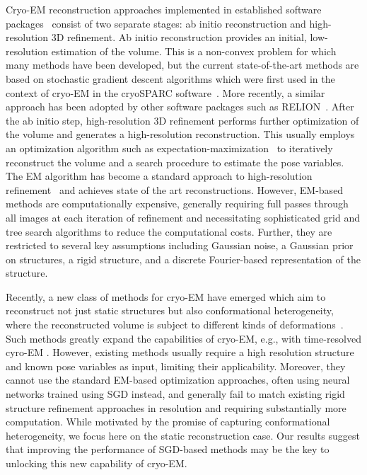 \documentclass{article}
\begin{document}
Cryo-EM reconstruction approaches implemented in established software packages~\cite{scheres_relion_2012,punjani_cryosparc_2017} consist of two separate stages: ab initio reconstruction and high-resolution 3D refinement. 
Ab initio reconstruction provides an initial, low-resolution estimation of the volume. 
This is a non-convex problem for which many methods have been developed, but the current state-of-the-art methods are based on stochastic gradient descent algorithms which were first used in the context of cryo-EM in the cryoSPARC software~\cite{punjani_building_2017,punjani_cryosparc_2017}. 
More recently, a similar approach has been adopted by other software packages such as RELION~\cite{kimanius_new_2021}.
After the ab initio step, high-resolution 3D refinement performs further optimization of the volume and generates a high-resolution reconstruction.
This usually employs an optimization algorithm such as 
expectation-maximization~\cite{dempster_maximum_1977} to iteratively reconstruct 
the volume and a search procedure to estimate the pose variables.
The EM algorithm has become a standard approach to high-resolution refinement~\cite{tagare_fast_2008,scheres_bayesian_2012,scheres_relion_2012,punjani_cryosparc_2017} and achieves state of the art reconstructions.
However, EM-based methods are computationally expensive, generally requiring full passes through all images at each iteration of refinement and necessitating sophisticated grid and tree search algorithms to reduce the computational costs.
Further, they are restricted to several key assumptions including Gaussian noise, a Gaussian prior on structures, a rigid structure, and a discrete Fourier-based representation of the structure.

Recently, a new class of methods for cryo-EM have emerged which aim to reconstruct not just static structures but also conformational heterogeneity, where the reconstructed 
volume is subject to different kinds of deformations~\cite{toader_methods_2023,lederman_hyper-molecules_2020,zhong_cryodrgn_2021,zhong_cryodrgn2_2021,levy_amortized_2022,chen_deep_2021,chen_integrating_2023,chen_improving_2023,punjani_3dva_2021,punjani_3dflex_2023,gupta_cryogan_2021,gupta_multi-cryogan_2020,herreros_zart_2023,esteve-yague_spectral_2023,schwab_dynamight_2024,li_cryostar_2024,gilles_cryo-em_2025,woollard_instamap_2025}.
Such methods greatly expand the capabilities of cryo-EM, e.g., with time-resolved cyro-EM \cite{torino_time-resolved_2023,bhattacharjee_time_2024}.
However, existing methods usually require a high resolution structure and known 
pose variables as input, limiting their applicability.
Moreover, they cannot use the standard EM-based optimization approaches, often using 
neural networks trained using SGD instead, and generally fail to match existing 
rigid structure refinement approaches in resolution and requiring substantially 
more computation. While motivated by the promise of capturing conformational heterogeneity, 
we focus here on the static reconstruction case.
Our results suggest that improving the performance of SGD-based methods may be 
the key to unlocking this new capability of cryo-EM.
\end{document}
